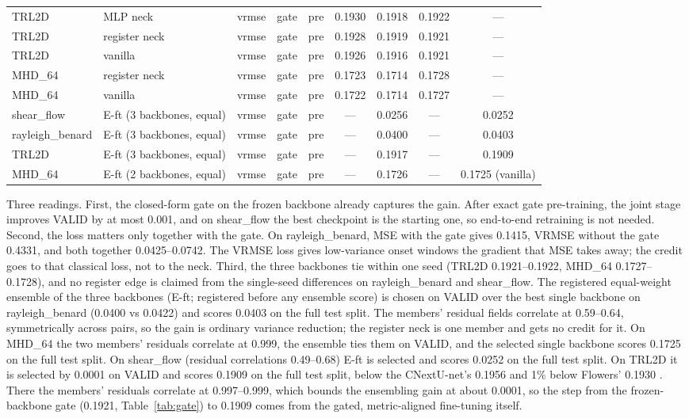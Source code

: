 \documentclass{article}
\begin{document}
\begin{table}[h]
\begin{tabular}{lllllcccc}
TRL2D & MLP neck & vrmse & gate & pre & 0.1930 & 0.1918 & 0.1922 & --- \\
TRL2D & register neck & vrmse & gate & pre & 0.1928 & 0.1919 & 0.1921 & --- \\
TRL2D & vanilla & vrmse & gate & pre & 0.1926 & 0.1916 & 0.1921 & --- \\
MHD\_64 & register neck & vrmse & gate & pre & 0.1723 & 0.1714 & 0.1728 & --- \\
MHD\_64 & vanilla & vrmse & gate & pre & 0.1722 & 0.1714 & 0.1727 & --- \\
shear\_flow & E-ft (3 backbones, equal) & vrmse & gate & pre & --- & 0.0256 & --- & 0.0252 \\
rayleigh\_benard & E-ft (3 backbones, equal) & vrmse & gate & pre & --- & 0.0400 & --- & 0.0403 \\
TRL2D & E-ft (3 backbones, equal) & vrmse & gate & pre & --- & 0.1917 & --- & 0.1909 \\
MHD\_64 & E-ft (2 backbones, equal) & vrmse & gate & pre & --- & 0.1726 & --- & 0.1725 (vanilla) \\
\bottomrule
\end{tabular}
\end{table}

Three readings. First, the closed-form gate on the frozen backbone already captures the gain. After exact gate
pre-training, the joint stage improves VALID by at most 0.001, and on shear\_flow the best checkpoint is the starting
one, so end-to-end retraining is not needed. Second, the loss matters only together with the gate. On
rayleigh\_benard, MSE with the gate gives 0.1415, VRMSE without the gate 0.4331, and both together 0.0425--0.0742. The
VRMSE loss gives low-variance onset windows the gradient that MSE takes away; the credit goes to that classical loss,
not to the neck. Third, the three backbones tie within one seed (TRL2D 0.1921--0.1922, MHD\_64 0.1727--0.1728), and no
register edge is claimed from the single-seed differences on rayleigh\_benard and shear\_flow.
The registered equal-weight ensemble of the three backbones (E-ft; registered before any ensemble score) is chosen on
VALID over the best single backbone on rayleigh\_benard (0.0400 vs 0.0422) and scores 0.0403 on the full test split. The
members' residual fields correlate at 0.59--0.64, symmetrically across pairs, so the gain is ordinary variance
reduction; the register neck is one member and gets no credit for it. On MHD\_64 the two members' residuals correlate
at 0.999, the ensemble ties them on VALID, and the selected single backbone scores 0.1725 on the full test split.
On shear\_flow (residual correlations 0.49--0.68) E-ft is selected and scores 0.0252 on the full test split. On TRL2D it is selected by 0.0001 on VALID
and scores 0.1909 on the full test split, below the CNextU-net's 0.1956 and 1\% below Flowers' 0.1930 \citep{muser2026flowers}. There the members' residuals correlate at
0.997--0.999, which bounds the ensembling gain at about 0.0001, so the step from the frozen-backbone gate (0.1921,
Table~\ref{tab:gate}) to 0.1909 comes from the gated, metric-aligned fine-tuning itself.
\end{document}
